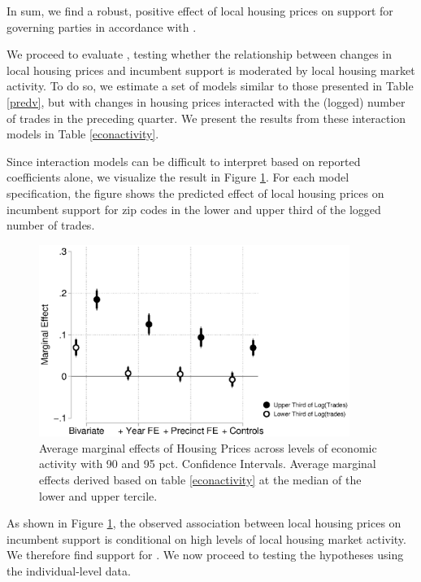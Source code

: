 \documentclass[12pt,a4paper]{article}
\begin{document}
	In sum, we find a robust, positive effect of local housing prices on support for governing parties in accordance with \hone.
	
	
	We proceed to evaluate \htwo, testing whether the relationship between changes in local housing prices and incumbent support is moderated by local housing market activity. To do so, we estimate a set of models similar to those presented in Table \ref{predv}, but with changes in housing prices interacted with the (logged) number of trades in the preceding quarter. We present the results from these interaction models in Table \ref{econactivity}.
	
	
	
	Since interaction models can be difficult to interpret based on reported coefficients alone, we visualize the result in Figure \ref{localactivity}. For each model specification, the figure shows the predicted effect of local housing prices on incumbent support for zip codes in the lower and upper third of the logged number of trades. 	
	\begin{figure}[htbp!]
		\includegraphics[width=0.9\textwidth]{../figures/localactivity.eps}
		\centering
		\caption{Average marginal effects of Housing Prices across levels of economic activity with 90  and 95 pct. Confidence Intervals.  Average marginal effects derived based on table \ref{econactivity} at the median of the lower and upper tercile.}\label{localactivity}
	\end{figure}
	
	As shown in Figure \ref{localactivity}, the observed association between local housing prices on incumbent support is conditional on high levels of local housing market activity. We therefore find support for \htwo. We now proceed to testing the hypotheses using the individual-level data.
	
\end{document}
